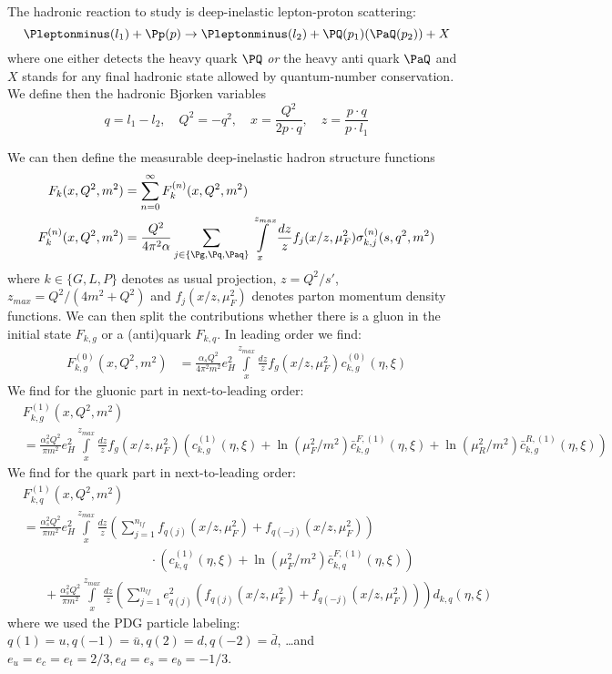 The hadronic reaction to study is deep-inelastic lepton-proton scattering:
\begin{equation}
\Pleptonminus(l_1) + \Pp(p) \rightarrow \Pleptonminus(l_2) + \PQ(p_1)(\PaQ(p_2)) + X
\end{equation}
where one either detects the heavy quark $\PQ$ \textit{or} the heavy anti quark $\PaQ$ and $X$ stands for any final hadronic state allowed by quantum-number conservation. We define then the hadronic Bjorken variables
\begin{equation}
q=l_1-l_2, \quad Q^2=-q^2, \quad x=\frac{Q^2}{2p\cdot q}, \quad z = \frac{p\cdot q}{p\cdot l_1}
\end{equation}

We can then define the measurable deep-inelastic hadron structure functions
\begin{align}
F_k(x,Q^2,m^2) &= \sum_{n=0}^\infty F_{k}^{(n)}(x,Q^2,m^2)\\
F_{k}^{(n)}(x,Q^2,m^2) &= \frac{Q^2}{4\pi^2\alpha} \sum_{j\in\{\Pg,\Pq,\Paq\}}\int\limits_x^{z_{max}} \frac{dz}{z} f_j(x/z,\mu_F^2) \sigma^{(n)}_{k,j}(s,q^2,m^2)
\end{align}
where $k\in\{G,L,P\}$ denotes as usual projection, $z=Q^2/s'$, $z_{max} = Q^2/(4m^2+Q^2)$ and $f_j(x/z,\mu_F^2)$ denotes parton momentum density functions\cite{Martin:2009iq,PhysRevLett.113.012001}.
We can then split the contributions whether there is a gluon in the initial state $F_{k,g}$ or a (anti)quark $F_{k,q}$. In leading order we find:
\begin{align}
F_{k,g}^{(0)}(x,Q^2,m^2) &= \frac{\alpha_sQ^2}{4\pi^2m^2}e_H^2\int\limits_x^{z_{max}}\frac{dz}{z} f_g(x/z,\mu_F^2) c^{(0)}_{k,g}(\eta,\xi)
\end{align}
We find for the gluonic part in next-to-leading order:
\begin{align}
&F_{k,g}^{(1)}(x,Q^2,m^2) \nonumber\\
 &= \frac{\alpha_s^2Q^2}{\pi m^2}e_H^2\int\limits_x^{z_{max}}\frac{dz}{z} f_g(x/z,\mu_F^2) \left(c_{k,g}^{(1)}(\eta,\xi) + \ln(\mu_F^2/m^2)\bar c_{k,g}^{F,(1)}(\eta,\xi) + \ln(\mu_R^2/m^2)\bar c_{k,g}^{R,(1)}(\eta,\xi)\right)
\end{align}
We find for the quark part in next-to-leading order:
\begin{align}
&F_{k,q}^{(1)}(x,Q^2,m^2) \nonumber\\
 &= \frac{\alpha_s^2Q^2}{\pi m^2}e_H^2\int\limits_x^{z_{max}}\frac{dz}{z} \left(\sum_{j=1}^{n_{lf}}f_{q(j)}(x/z,\mu_F^2)+f_{q(-j)}(x/z,\mu_F^2)\right) \nonumber\\
 &\hspace{120pt} \cdot\left(c_{k,q}^{(1)}(\eta,\xi) + \ln(\mu_F^2/m^2)\bar c_{k,q}^{F,(1)}(\eta,\xi)\right) \nonumber\\
 &\hspace{20pt} + \frac{\alpha_s^2Q^2}{\pi m^2}\int\limits_x^{z_{max}}\frac{dz}{z} \left(\sum_{j=1}^{n_{lf}}e_{q(j)}^2\left(f_{q(j)}(x/z,\mu_F^2)+f_{q(-j)}(x/z,\mu_F^2)\right)\right) d_{k,q}(\eta,\xi)
\end{align}
where we used the PDG particle labeling\cite{Hagiwara:2002fs}: $q(1)=u,q(-1)=\bar u,q(2)=d,q(-2)=\bar d$, \ldots and $e_u = e_c = e_t = 2/3, e_d=e_s=e_b=-1/3$. 

